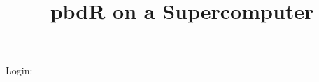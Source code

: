 \documentclass[a4paper,10pt]{article}
\title{pbdR on a Supercomputer}
\author{}
\date{}
\begin{document}
\maketitle

Login: \nautiluslogin
\end{document}
